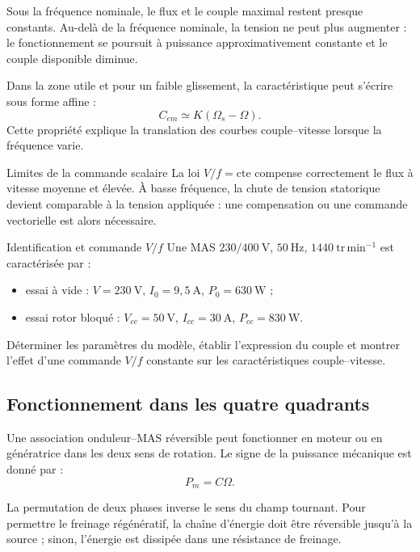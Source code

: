 Sous la fréquence nominale, le flux et le couple maximal restent presque constants. Au-delà de la fréquence nominale, la tension ne peut plus augmenter : le fonctionnement se poursuit à puissance approximativement constante et le couple disponible diminue.


Dans la zone utile et pour un faible glissement, la caractéristique peut s'écrire sous forme affine :
\[
C_{em}\simeq K(\Omega_s-\Omega).
\]
Cette propriété explique la translation des courbes couple--vitesse lorsque la fréquence varie.

\begin{TLMachineWarning}{Limites de la commande scalaire}
La loi $V/f=\mathrm{cte}$ compense correctement le flux à vitesse moyenne et élevée. À basse fréquence, la chute de tension statorique devient comparable à la tension appliquée : une compensation ou une commande vectorielle est alors nécessaire.
\end{TLMachineWarning}

\begin{TLMachineExercise}{Identification et commande $V/f$}
Une MAS $230/400\ \mathrm V$, $50\ \mathrm{Hz}$, $1440\ \mathrm{tr\,min^{-1}}$ est caractérisée par :
\begin{itemize}
  \item essai à vide : $V=230\ \mathrm V$, $I_0=9{,}5\ \mathrm A$, $P_0=630\ \mathrm W$ ;
  \item essai rotor bloqué : $V_{cc}=50\ \mathrm V$, $I_{cc}=30\ \mathrm A$, $P_{cc}=830\ \mathrm W$.
\end{itemize}
Déterminer les paramètres du modèle, établir l'expression du couple et montrer l'effet d'une commande $V/f$ constante sur les caractéristiques couple--vitesse.
\end{TLMachineExercise}

\subsection{Fonctionnement dans les quatre quadrants}

Une association onduleur--MAS réversible peut fonctionner en moteur ou en génératrice dans les deux sens de rotation. Le signe de la puissance mécanique est donné par :
\[
P_m=C\Omega.
\]

\begin{center}\TLQuadrantsMachine\end{center}

La permutation de deux phases inverse le sens du champ tournant. Pour permettre le freinage régénératif, la chaîne d'énergie doit être réversible jusqu'à la source ; sinon, l'énergie est dissipée dans une résistance de freinage.
